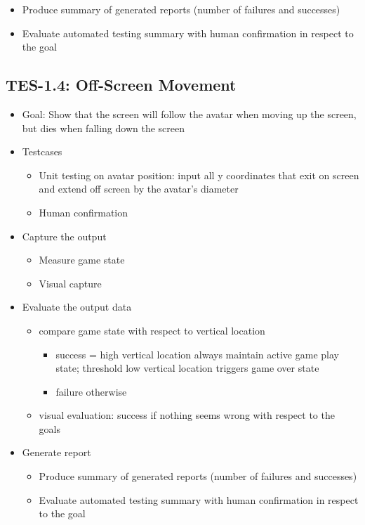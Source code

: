 \begin{itemize}
\begin{itemize}
\item Produce summary of generated reports (number of failures and successes)
\item Evaluate automated testing summary with human confirmation in respect to the goal
\end{itemize}
\end{itemize}


\subsection{TES-1.4: Off-Screen Movement}
\begin{itemize}
\item Goal: Show that the screen will follow the avatar when moving up the screen, but dies when falling down the screen

\item Testcases
\begin{itemize}
\item Unit testing on avatar position: input all y coordinates that exit on screen and extend off screen by the avatar’s diameter
\item Human confirmation
\end{itemize}

\item Capture the output
\begin{itemize}
\item Measure game state
\item Visual capture
\end{itemize}

\item Evaluate the output data
\begin{itemize}
\item compare game state with respect to vertical location
\begin{itemize}
\item success = high vertical location always maintain active game play state; threshold low vertical location triggers game over state
\item failure otherwise
\end{itemize}
\item visual evaluation: success if nothing seems wrong with respect to the goals
\end{itemize}

\item Generate report
\begin{itemize}
\item Produce summary of generated reports (number of failures and successes)
\item Evaluate automated testing summary with human confirmation in respect to the goal
\end{itemize}
\end{itemize}


